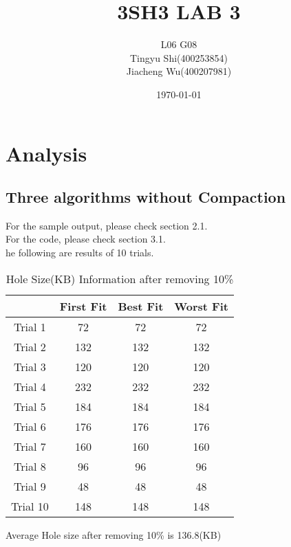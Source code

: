 \documentclass[12pt]{article}
\title{3SH3 LAB 3}
\author{
L06 G08\\
Tingyu Shi(400253854)\\
Jiacheng Wu(400207981)}
\date{\today}
\begin{document}
\maketitle %
\newpage
\section{Analysis}
\subsection{Three algorithms without Compaction}
For the sample output, please check section 2.1.\\
For the code, please check section 3.1.\\
he following are results of 10 trials.
\begin{table}[h!]
\centering
\begin{tabular}{|c|c|c|c|}
\hline
         & First Fit & Best Fit & Worst Fit \\ \hline
Trial 1  & 72        & 72       & 72        \\ \hline
Trial 2  & 132       & 132      & 132       \\ \hline
Trial 3  & 120       & 120      & 120       \\ \hline
Trial 4  & 232       & 232      & 232       \\ \hline
Trial 5  & 184       & 184      & 184       \\ \hline
Trial 6  & 176       & 176      & 176        \\ \hline
Trial 7  & 160       & 160      & 160       \\ \hline
Trial 8  & 96        & 96       & 96       \\ \hline
Trial 9  & 48        & 48       & 48       \\ \hline
Trial 10 & 148       & 148      & 148        \\ \hline
\end{tabular}
\caption{Hole Size(KB) Information after removing 10\% }
\end{table}

\noindent Average Hole size after removing 10\% is 136.8(KB) 
\end{document}
